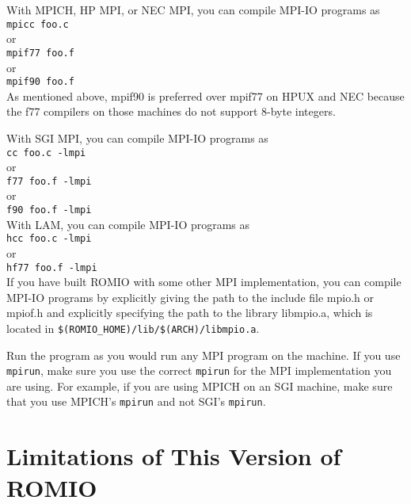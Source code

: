 With MPICH, HP MPI, or NEC MPI, you can compile MPI-IO programs as \\
\hspace*{.4in} {\tt mpicc foo.c}\\
or \\
\hspace*{.4in} {\tt mpif77 foo.f }\\
or\\
\hspace*{.4in} {\tt mpif90 foo.f}\\

As mentioned above, mpif90 is preferred over mpif77 on HPUX and NEC
because the f77 compilers on those machines do not support 8-byte integers.

With SGI MPI, you can compile MPI-IO programs as \\
\hspace*{.4in} {\tt cc foo.c -lmpi}\\
or \\
\hspace*{.4in} {\tt f77 foo.f -lmpi}\\
or \\
\hspace*{.4in} {\tt f90 foo.f -lmpi}\\

With LAM, you can compile MPI-IO programs as \\
\hspace*{.4in} {\tt hcc foo.c -lmpi}\\
or \\
\hspace*{.4in} {\tt hf77 foo.f -lmpi}\\

If you have built ROMIO with some other MPI implementation, you can
compile MPI-IO programs by explicitly giving the path to the include
file mpio.h or mpiof.h and explicitly specifying the path to the
library libmpio.a, which is located in {\tt \$(ROMIO\_HOME)/lib/\$(ARCH)/libmpio.a}.

Run the program as you would run any MPI program on the machine.
If you use {\tt mpirun}, make sure you use the correct {\tt mpirun}
for the MPI implementation you are using. For example, if you
are using MPICH on an SGI machine, make sure that you use MPICH's
{\tt mpirun} and not SGI's {\tt mpirun}.


%
%
\section{Limitations of This Version of ROMIO \label{sec:limit}}

